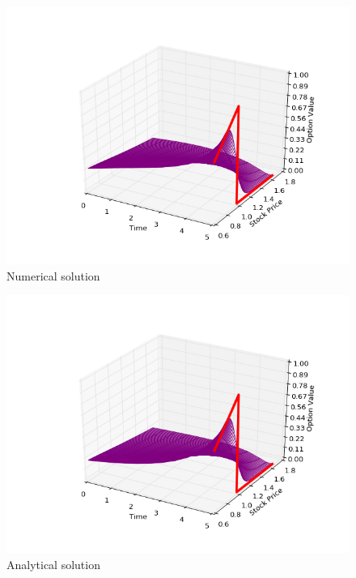 \documentclass[11pt,a4paper]{extarticle}
\begin{document}
\begin{minipage}{\linewidth}
      \centering
      \begin{minipage}{0.3\linewidth}
          \begin{figure}[H]
              \includegraphics[width=\linewidth]{Figures/a-o-n-put-num}
              \caption{Numerical solution}
          \end{figure}
      \end{minipage}
      \hspace{0.05\linewidth}
      \begin{minipage}{0.3\linewidth}
          \begin{figure}[H]
              \includegraphics[width=\linewidth]{Figures/a-o-n-put-analyt}
              \caption{Analytical solution}
          \end{figure}
      \end{minipage}
  \end{minipage}
\end{document}
